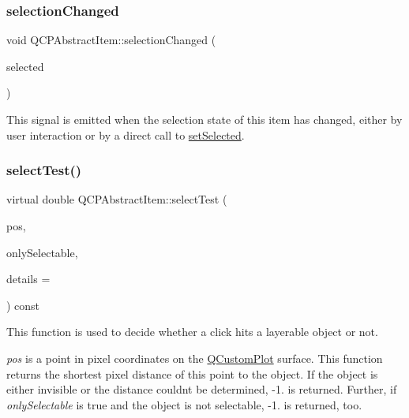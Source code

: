 \subsubsection{\texorpdfstring{selection\+Changed}{selectionChanged}}
{\footnotesize\ttfamily void Q\+C\+P\+Abstract\+Item\+::selection\+Changed (\begin{DoxyParamCaption}\item[{bool}]{selected }\end{DoxyParamCaption})\hspace{0.3cm}{\ttfamily [signal]}}

This signal is emitted when the selection state of this item has changed, either by user interaction or by a direct call to \hyperlink{class_q_c_p_abstract_item_a203de94ad586cc44d16c9565f49d3378}{set\+Selected}. \mbox{\label{class_q_c_p_abstract_item_ae41d0349d68bb802c49104afd100ba2a}} 
\subsubsection{\texorpdfstring{select\+Test()}{selectTest()}\hspace{0.1cm}{\footnotesize\ttfamily [1/2]}}
{\footnotesize\ttfamily virtual double Q\+C\+P\+Abstract\+Item\+::select\+Test (\begin{DoxyParamCaption}\item[{const Q\+PointF \&}]{pos,  }\item[{bool}]{only\+Selectable,  }\item[{Q\+Variant $\ast$}]{details = {} }\end{DoxyParamCaption}) const\hspace{0.3cm}{\ttfamily [pure virtual]}}

This function is used to decide whether a click hits a layerable object or not.

{\itshape pos} is a point in pixel coordinates on the \hyperlink{class_q_custom_plot}{Q\+Custom\+Plot} surface. This function returns the shortest pixel distance of this point to the object. If the object is either invisible or the distance couldn\textquotesingle{}t be determined, -\/1. is returned. Further, if {\itshape only\+Selectable} is true and the object is not selectable, -\/1. is returned, too.

